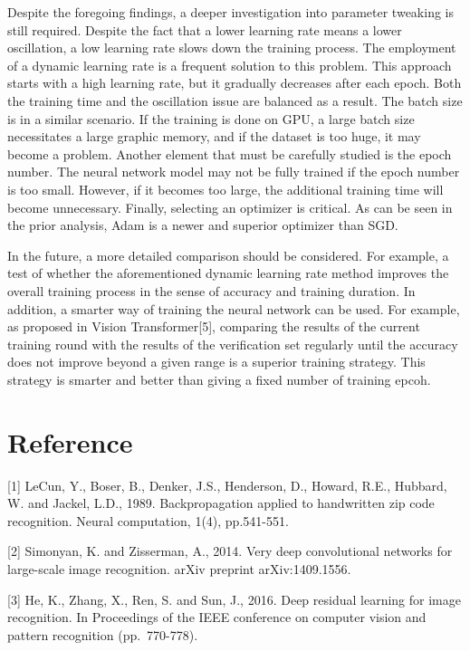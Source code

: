 \documentclass[11pt]{article}
\begin{document}
Despite the foregoing findings, a deeper investigation into parameter
tweaking is still required. Despite the fact that a lower learning rate
means a lower oscillation, a low learning rate slows down the training
process. The employment of a dynamic learning rate is a frequent
solution to this problem. This approach starts with a high learning
rate, but it gradually decreases after each epoch. Both the training
time and the oscillation issue are balanced as a result. The batch size
is in a similar scenario. If the training is done on GPU, a large batch
size necessitates a large graphic memory, and if the dataset is too
huge, it may become a problem. Another element that must be carefully
studied is the epoch number. The neural network model may not be fully
trained if the epoch number is too small. However, if it becomes too
large, the additional training time will become unnecessary. Finally,
selecting an optimizer is critical. As can be seen in the prior
analysis, Adam is a newer and superior optimizer than SGD.

In the future, a more detailed comparison should be considered. For
example, a test of whether the aforementioned dynamic learning rate
method improves the overall training process in the sense of accuracy
and training duration. In addition, a smarter way of training the neural
network can be used. For example, as proposed in Vision
Transformer{[}5{]}, comparing the results of the current training round
with the results of the verification set regularly until the accuracy
does not improve beyond a given range is a superior training strategy.
This strategy is smarter and better than giving a fixed number of
training epcoh.

    \hypertarget{reference}{%
\section{Reference}\label{reference}}

{[}1{]} LeCun, Y., Boser, B., Denker, J.S., Henderson, D., Howard, R.E.,
Hubbard, W. and Jackel, L.D., 1989. Backpropagation applied to
handwritten zip code recognition. Neural computation, 1(4), pp.541-551.

{[}2{]} Simonyan, K. and Zisserman, A., 2014. Very deep convolutional
networks for large-scale image recognition. arXiv preprint
arXiv:1409.1556.

{[}3{]} He, K., Zhang, X., Ren, S. and Sun, J., 2016. Deep residual
learning for image recognition. In Proceedings of the IEEE conference on
computer vision and pattern recognition (pp.~770-778).
\end{document}
